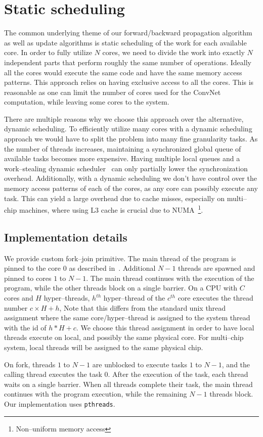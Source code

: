 \section{Static scheduling}

  The common underlying theme of our forward/backward propagation
  algorithm as well as update algorithms is static scheduling of the
  work for each available core.  In order to fully utilize $N$ cores,
  we need to divide the work into exactly $N$ independent parts that
  perform roughly the same number of operations.  Ideally all the
  cores would execute the same code and have the same memory access
  patterns.  This approach relies on having exclusive access to all
  the cores.  This is reasonable as one can limit the number of cores
  used for the ConvNet computation, while leaving some cores to the
  system.

  There are multiple reasons why we choose this approach over the
  alternative, dynamic scheduling.  To efficiently utilize many cores
  with a dynamic scheduling approach we would have to split the
  problem into many fine granularity tasks.  As the number of threads
  increases, maintaining a synchronized global queue of available
  tasks becomes more expensive.  Having multiple local queues and a
  work--stealing dynamic
  scheduler~\cite{reinders2007intel,willhalm2008putting} can only
  partially lower the synchronization overhead.  Additionally, with a
  dynamic scheduling we don't have control over the memory access
  patterns of each of the cores, as any core can possibly execute any
  task.  This can yield a large overhead due to cache misses,
  especially on multi--chip machines, where using L3 cache is crucial
  due to NUMA~\footnote{Non--uniform memory access}.

  \subsection{Implementation details}

  We provide custom fork--join primitive.  The main thread of the
  program is pinned to the core $0$ as described
  in~\cite{jeffers2015high}. Additional $N-1$ threads are spawned and
  pinned to cores $1$ to $N-1$.  The main thread continues with the
  execution of the program, while the other threads block on a single
  barrier.  On a CPU with $C$ cores and $H$ hyper--threads, $h^{th}$
  hyper--thread of the $c^{th}$ core executes the thread number $c
  \times H + h$, Note that this differs from the standard unix thread
  assignment where the same core/hyper--thread is assigned to the
  system thread with the id of $h * H + c$.  We choose this thread
  assignment in order to have local threads execute on local, and
  possibly the same physical core.  For multi--chip system, local
  threads will be assigned to the same physical chip.

  On fork, threads $1$ to $N-1$ are unblocked to execute tasks $1$ to
  $N-1$, and the calling thread executes the task $0$.  After the
  execution of the task, each thread waits on a single barrier.  When
  all threads complete their task, the main thread continues with the
  program execution, while the remaining $N-1$ threads block.  Our
  implementation uses \texttt{pthreads}.
